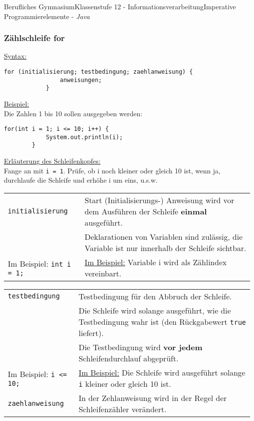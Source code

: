 \documentclass[oneside,openany,headings=optiontotoc,11pt,numbers=noenddot]{article}
\begin{document}
\begin{worksheet}{Berufliches Gymnasium}{Klassenstufe 12 - Informationsverarbeitung}{Imperative Programmierelemente - \textit{Java}}
		\subsubsection{Zählschleife for}
		\underline{Syntax:}
		\begin{lstlisting}[style=JavaInputStyle]
			for (initialisierung; testbedingung; zaehlanweisung) {
				anweisungen;
			}
		\end{lstlisting}
		\underline{Beispiel:}\\
		Die Zahlen 1 bis 10 sollen ausgegeben werden:\\
		\begin{lstlisting}[style=JavaInputStyle]
		for(int i = 1; i <= 10; i++) {
			System.out.println(i);
		}
		\end{lstlisting}
		\underline{Erläuterung des Schleifenkopfes:}\\
		Fange an mit \lstinline[style=JavaInputStyle]|i = 1|. Prüfe, ob i noch kleiner oder gleich 10 ist, wenn ja, durchlaufe die Schleife und erhöhe i um eins, u.s.w.\\
		\par\noindent
		\begin{tabularx}{\textwidth}{|l|X|}
			\hline
			{\lstinline[style=JavaInputStyle]|initialisierung|} & Start (Initialisierungs-) Anweisung wird vor dem Ausführen der Schleife \textbf{einmal} ausgeführt.\\
			& Deklarationen von Variablen sind zulässig, die Variable ist nur innerhalb der Schleife sichtbar.\\
			Im Beispiel: {\lstinline[style=JavaInputStyle]|int i = 1;|} & \underline{Im Beispiel:} Variable i wird als Zählindex vereinbart.\\
			\hline
		\end{tabularx}
		\begin{tabularx}{\textwidth}{|l|X|}
			\hline
			{\lstinline[style=JavaInputStyle]|testbedingung|} & Testbedingung für den Abbruch der Schleife.\\
			& Die Schleife wird solange ausgeführt, wie die Testbedingung wahr ist (den Rückgabewert {\lstinline[style=JavaInputStyle]|true|} liefert).\\
			& Die Testbedingung wird \textbf{vor jedem} Schleifendurchlauf abgeprüft.\\
			Im Beispiel: {\lstinline[style=JavaInputStyle]|i <= 10;|} & \underline{Im Beispiel:} Die Schleife wird ausgeführt solange {\lstinline[style=JavaInputStyle]|i|} kleiner oder gleich 10 ist.\\
			\hline
			{\lstinline[style=JavaInputStyle]|zaehlanweisung|} & In der Zehlanweisung wird in der Regel der Schleifenzähler verändert.\\

\end{tabularx}
\end{worksheet}
\end{document}
